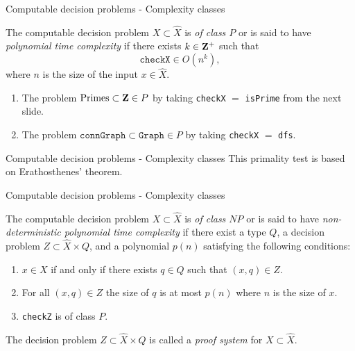 \begin{frame}{Computable decision problems - Complexity classes}
	\begin{defn}
		The computable decision problem $X \subset \hat{X}$ is
		\emph{of class $P$} or is said to have \emph{polynomial time complexity}
		if there exists $k \in \mathbf{Z}^+$ such that
		\[
			\mathtt{checkX} \in O(n^k),
		\]
		where $n$ is the size of the input $x \in \hat{X}$.
	\end{defn}

	\pause
	\begin{exl}
		\begin{enumerate}
			\item The problem
				\(
					\text{Primes} \subset \mathbf{Z} \in P
				\)
				by taking \texttt{checkX} $=$ \texttt{isPrime} from the
				next slide.
			\item The problem 
				\(
					\mathtt{connGraph} \subset \mathtt{Graph} \in P
				\)
				by taking \texttt{checkX} $=$ \texttt{dfs}.
		\end{enumerate}
	\end{exl}
\end{frame}

%

\begin{frame}{Computable decision problems - Complexity classes}
	This primality test is based on Erathosthenes' theorem.

	\bigskip
	
\end{frame}

%

\begin{frame}{Computable decision problems - Complexity classes}
	\begin{defn}
		The computable decision problem $X \subset \hat{X}$ is
		\emph{of class $NP$} or is said to have
		\emph{non-deterministic polynomial time complexity} if there exist
		a type $Q$, a decision problem $Z \subset \hat{X} \times Q$, and a
		polynomial $p(n)$ satisfying the following conditions:
		\begin{enumerate}
			\item $x \in X$ if and only if there exists $q \in Q$ such that
				$(x, q) \in Z$.
			\item For all $(x, q) \in Z$ the size of $q$ is at most $p(n)$
				where $n$ is the size of $x$.
			\item \texttt{checkZ} is of class $P$.
		\end{enumerate}

		The decision problem $Z \subset \hat{X} \times Q$ is called a
		\emph{proof system} for $X \subset \hat{X}$.
	\end{defn}
\end{frame}

